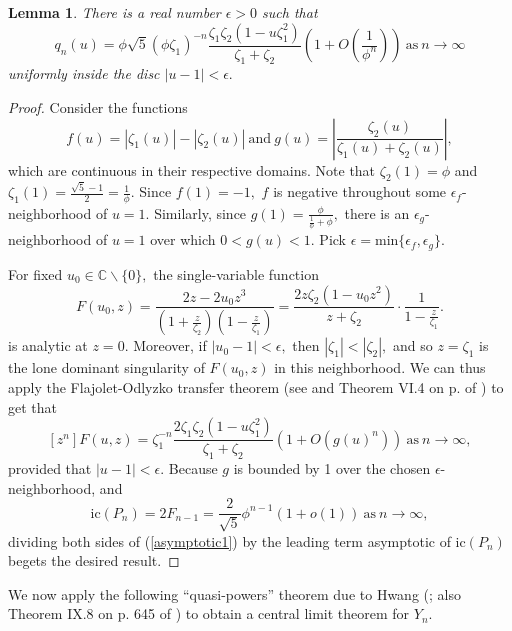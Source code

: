\documentclass[11pt, reqno]{amsart}
\newtheorem{lemma}[theorem]{Lemma}
\theoremstyle{definition}
\begin{document}
\begin{lemma}
There is a real number $\epsilon > 0$ such that
\[q_n(u) = \phi\sqrt{5}\left(\phi\zeta_1\right)^{-n}\frac{\zeta_1\zeta_2(1-u\zeta_1^2)}{\zeta_1 + \zeta_2}\left(1+O\left(\frac{1}{\phi^n}\right)\right)\ \text{as}\ n \to \infty\]
uniformly inside the disc $|u - 1| < \epsilon.$
\end{lemma}

\begin{proof}
Consider the functions
\[f(u) = |\zeta_1(u)| - |\zeta_2(u)|\ \text{and}\ g(u) = \left|\frac{\zeta_2(u)}{\zeta_1(u)+\zeta_2(u)}\right|,\]
which are continuous in their respective domains. Note that $\zeta_2(1) = \phi$ and $\zeta_1(1) = \frac{\sqrt{5}-1}{2} = \frac{1}{\phi}.$ Since $f(1) = -1,$ $f$ is negative throughout some $\epsilon_f$-neighborhood of $u = 1.$ Similarly, since $g(1) = \frac{\phi}{\frac{1}{\phi}+\phi},$ there is an $\epsilon_g$-neighborhood of $u=1$ over which $0 < g(u) < 1.$ Pick $\epsilon = \text{min}\{\epsilon_f, \epsilon_g\}.$

For fixed $u_0 \in \mathbb{C}\backslash\{0\},$ the single-variable function
\begin{equation}
F(u_0,z) = \frac{2z-2u_0z^3}{\left(1+\frac{z}{\zeta_2}\right)\left(1-\frac{z}{\zeta_1}\right)} = \frac{2z\zeta_2(1-u_0z^2)}{z+\zeta_2}\cdot\frac{1}{1-\frac{z}{\zeta_1}}.
\end{equation}
is analytic at $z = 0.$ Moreover, if $|u_0 - 1| < \epsilon,$ then $|\zeta_1| < |\zeta_2|,$ and so $z = \zeta_1$ is the lone dominant singularity of $F(u_0, z)$ in this neighborhood. We can thus apply the Flajolet-Odlyzko transfer theorem (see \cite{FO} and Theorem VI.4 on p. of \cite{FS}) to get that
\begin{equation}
\label{asymptotic1}
[z^n]F(u,z) = \zeta_1^{-n}\frac{2\zeta_1\zeta_2(1-u\zeta_1^2)}{\zeta_1 + \zeta_2}\left(1+O\left(g(u)^n\right)\right)\ \text{as}\ n \to \infty,
\end{equation}
provided that $|u - 1| < \epsilon.$ Because $g$ is bounded by 1 over the chosen $\epsilon$-neighborhood, and
\begin{equation}
\text{ic}(P_n) = 2F_{n-1} = \frac{2}{\sqrt{5}}\phi^{n-1}(1 + o(1))\ \text{as}\ n \to \infty,
\end{equation}
dividing both sides of (\ref{asymptotic1}) by the leading term asymptotic of $\text{ic}(P_n)$ begets the desired result.
\end{proof}

We now apply the following ``quasi-powers'' theorem due to Hwang (\cite{Hwang}; also Theorem IX.8 on p. 645 of \cite{FS}) to obtain a central limit theorem for $Y_n$.
\end{document}
